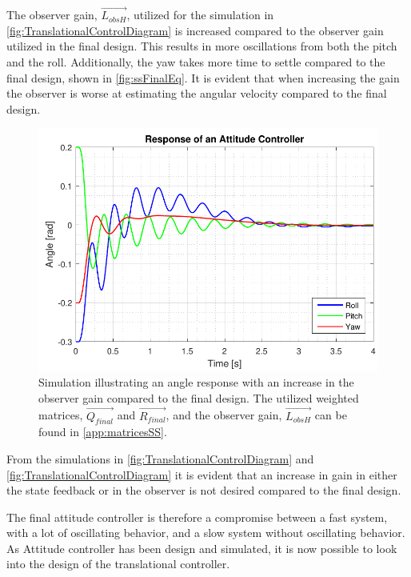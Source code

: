 %
The observer gain, $\vec{L_{obsH}}$, utilized for the simulation in  \autoref{fig:TranslationalControlDiagram} is increased compared to the observer gain utilized in the final design. This results in more oscillations from both the pitch and the roll. Additionally, the yaw takes more time to settle compared to the final design, shown in \autoref{fig:ssFinalEq}. It is evident that when increasing the gain the observer is worse at estimating the angular velocity compared to the final design.
%
\begin{figure}[H]
	\centering
	\includegraphics[scale=0.8]{figures/ssEqObsHigh.pdf}
	\caption{Simulation illustrating an angle response with an increase in the observer gain compared to the final design. The utilized weighted matrices, $\vec{Q_{final}}$ and $\vec{R_{final}}$, and the observer gain, $\vec{L_{obsH}}$ can be found in \autoref{app:matricesSS}.}
	\label{fig:TranslationalControlDiagram}
\end{figure}
%
From the simulations in \autoref{fig:TranslationalControlDiagram} and \autoref{fig:TranslationalControlDiagram} it is evident that an increase in gain in either the state feedback or in the observer is not desired compared to the final design.

The final attitude controller is therefore a compromise between a fast system, with a lot of oscillating behavior, and a slow system without oscillating behavior. As Attitude controller has been design and simulated, it is now possible to look into the design of the translational controller.


